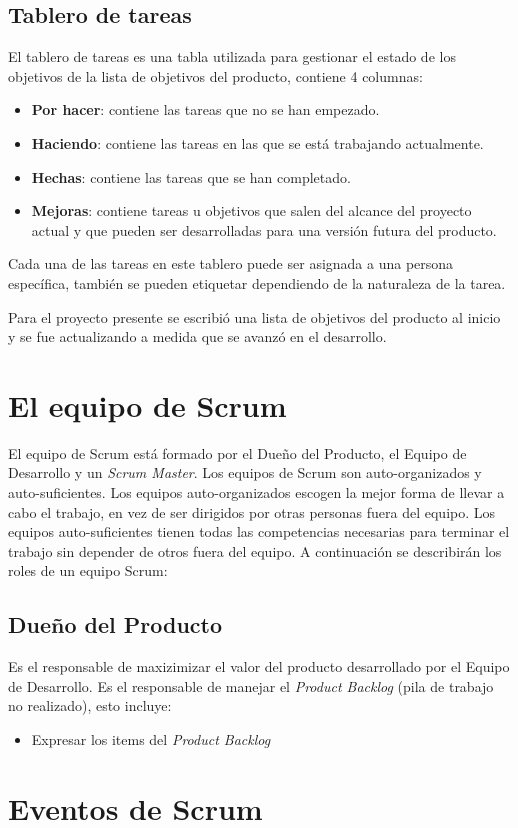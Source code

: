 \subsection{Tablero de tareas}
El tablero de tareas es una tabla utilizada para gestionar el estado de los objetivos de la lista de objetivos del producto, contiene 4 columnas:

\begin{itemize}
    \item \textbf{Por hacer}: contiene las tareas que no se han empezado.
    \item \textbf{Haciendo}: contiene las tareas en las que se está trabajando actualmente.
    \item \textbf{Hechas}: contiene las tareas que se han completado.
    \item \textbf{Mejoras}: contiene tareas u objetivos que salen del alcance del proyecto actual y que pueden ser desarrolladas para una versión futura del producto.
\end{itemize}

Cada una de las tareas en este tablero puede ser asignada a una persona específica, también se pueden etiquetar dependiendo de la naturaleza de la tarea.

Para el proyecto presente se escribió una lista de objetivos del producto al inicio y se fue actualizando a medida que se avanzó en el desarrollo. 

\section{El equipo de Scrum}
El equipo de Scrum está formado por el Dueño del Producto, el Equipo de Desarrollo y un \emph{Scrum Master}. Los equipos de Scrum son auto-organizados y auto-suficientes. Los equipos auto-organizados escogen la mejor forma de llevar a cabo el trabajo, en vez de ser dirigidos por otras personas fuera del equipo. Los equipos auto-suficientes tienen todas las competencias necesarias para terminar el trabajo sin depender de otros fuera del equipo. \cite{scrumSchwaber} A continuación se describirán los roles de un equipo Scrum:

\subsection{Dueño del Producto}
Es el responsable de maxizimizar el valor del producto desarrollado por el Equipo de Desarrollo. Es el responsable de manejar el \emph{Product Backlog} (pila de trabajo no realizado), esto incluye:

\begin{itemize}
    \item Expresar los items del \emph{Product Backlog}
\end{itemize}


\section{Eventos de Scrum}
